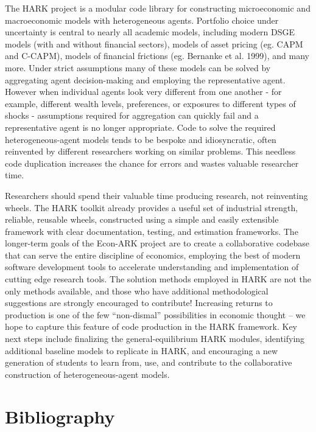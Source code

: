 \message{ !name(ccarroll_et_al_scipy_2018.tex)}\documentclass[10pt,twocolumn]{article}
\begin{document}
The HARK project is a modular code library for constructing
microeconomic and macroeconomic models with heterogeneous agents.
Portfolio choice under uncertainty is central to nearly all academic
models, including modern DSGE models (with and without financial
sectors), models of asset pricing (eg. CAPM and C-CAPM), models of
financial frictions (eg. Bernanke et al. 1999), and many more. Under
strict assumptions many of these models can be solved by aggregating
agent decision-making and employing the representative agent. However
when individual agents look very different from one another - for
example, different wealth levels, preferences, or exposures to different
types of shocks - assumptions required for aggregation can quickly fail
and a representative agent is no longer appropriate. Code to solve the
required heterogeneous-agent models tends to be bespoke and
idiosyncratic, often reinvented by different researchers working on
similar problems. This needless code duplication increases the chance
for errors and wastes valuable researcher time.

Researchers should spend their valuable time producing research, not reinventing wheels. The HARK toolkit already provides a useful set of industrial strength, reliable, reusable  wheels, constructed using a simple and easily extensible framework with clear documentation, testing, and estimation frameworks.  The longer-term goals of the Econ-ARK project are to create a collaborative codebase that can serve the entire discipline of economics, employing the best of modern software development tools to accelerate understanding and implementation of cutting edge research tools. The solution methods employed in HARK are not the only methods available, and those who have additional methodological suggestions are strongly encouraged to contribute! Increasing returns to production is one of the few ``non-dismal'' possibilities in economic thought -- we hope to capture this feature of code production in the HARK framework. Key next steps include finalizing the general-equilibrium HARK modules, identifying additional baseline models to replicate in HARK, and encouraging a new generation of students to learn from, use, and contribute to the collaborative construction of heterogeneous-agent models.

\section*{Bibliography}\label{bibliography}
\end{document}
